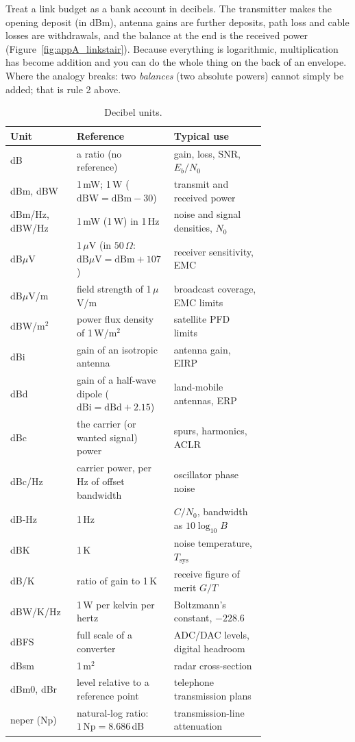 \begin{analogy}
Treat a link budget as a bank account in decibels. The transmitter makes the opening deposit (in
dBm), antenna gains are further deposits, path loss and cable losses are withdrawals, and the
balance at the end is the received power (Figure~\ref{fig:appA_linkstair}). Because everything is
logarithmic, multiplication has become addition and you can do the whole thing on the back of an
envelope. Where the analogy breaks: two \emph{balances} (two absolute powers) cannot simply be
added; that is rule 2 above.
\end{analogy}

\begin{table}[htbp]\centering\small
\caption{Decibel units.}\label{tab:appA:dbunits}
\begin{tabular}{@{}lp{0.38\linewidth}p{0.36\linewidth}@{}}
\toprule
Unit & Reference & Typical use\\
\midrule
dB & a ratio (no reference) & gain, loss, SNR, $E_b/N_0$\\
dBm, dBW & 1\,mW; 1\,W ($\mathrm{dBW}=\mathrm{dBm}-30$) & transmit and received power\\
dBm/Hz, dBW/Hz & 1\,mW (1\,W) in 1\,Hz & noise and signal densities, $N_0$\\
dB$\mu$V & 1\,$\mu$V (in $50\,\Omega$: $\mathrm{dB}\mu\mathrm{V}=\mathrm{dBm}+107$) & receiver sensitivity, EMC\\
dB$\mu$V/m & field strength of 1\,$\mu$V/m & broadcast coverage, EMC limits\\
dBW/m$^2$ & power flux density of 1\,W/m$^2$ & satellite PFD limits\\
dBi & gain of an isotropic antenna & antenna gain, EIRP\\
dBd & gain of a half-wave dipole ($\mathrm{dBi}=\mathrm{dBd}+2.15$) & land-mobile antennas, ERP\\
dBc & the carrier (or wanted signal) power & spurs, harmonics, ACLR\\
dBc/Hz & carrier power, per Hz of offset bandwidth & oscillator phase noise\\
dB-Hz & 1\,Hz & $C/N_0$, bandwidth as $10\log_{10}B$\\
dBK & 1\,K & noise temperature, $T_{\mathrm{sys}}$\\
dB/K & ratio of gain to 1\,K & receive figure of merit $G/T$\\
dBW/K/Hz & 1\,W per kelvin per hertz & Boltzmann's constant, $-228.6$\\
dBFS & full scale of a converter & ADC/DAC levels, digital headroom\\
dBsm & 1\,m$^2$ & radar cross-section\\
dBm0, dBr & level relative to a reference point & telephone transmission plans\\
neper (Np) & natural-log ratio: $1\,\mathrm{Np}=8.686$\,dB & transmission-line attenuation\\
\bottomrule
\end{tabular}
\end{table}

